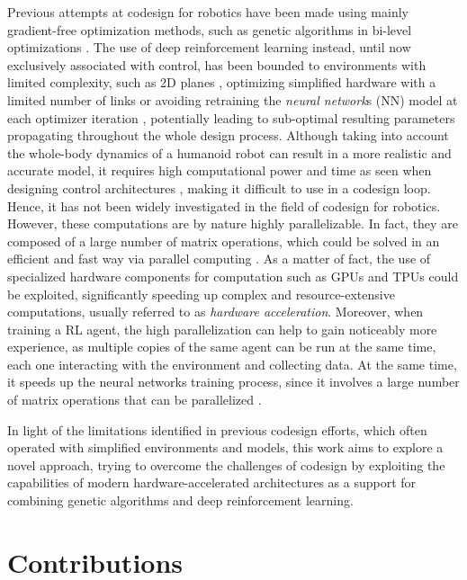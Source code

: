 Previous attempts at codesign for robotics have been made using mainly gradient-free optimization methods, such as genetic algorithms in bi-level optimizations \citep{sartore_optimization_2022,fadini_simulation_2022}. The use of deep reinforcement learning instead, until now exclusively associated with control, has been bounded to environments with limited complexity, such as 2D planes \citep{ha_reinforcement_2019}, optimizing simplified hardware with a limited number of links \citep{chen_hardware_2020} or avoiding retraining the \textit{neural network}s (NN) model at each optimizer iteration \citep{bjelonic_learning-based_2023}, potentially leading to sub-optimal resulting parameters propagating throughout the whole design process. Although taking into account the whole-body dynamics of a humanoid robot can result in a more realistic and accurate model, it requires high computational power and time as seen when designing control architectures \citep{ramuzat_benchmarking_2022}, making it difficult to use in a codesign loop. Hence, it has not been widely investigated in the field of codesign for robotics. However, these computations are by nature highly parallelizable. In fact, they are composed of a large number of matrix operations, which could be solved in an efficient and fast way via parallel computing \citep{gyawali_comparative_2023, tuma_2023}. As a matter of fact, the use of specialized hardware components for computation such as \ac{GPU}s and \ac{TPU}s could be exploited, significantly speeding up complex and resource-extensive computations, usually referred to as \textit{hardware acceleration}. Moreover, when training a \ac{RL} agent, the high parallelization can help to gain noticeably more experience, as multiple copies of the same agent can be run at the same time, each one interacting with the environment and collecting data. At the same time, it speeds up the neural networks training process, since it involves a large number of matrix operations that can be parallelized \citep{pandey_transformational_2022,gyawali_comparative_2023}.

In light of the limitations identified in previous codesign efforts, which often operated with simplified environments and models, this work aims to explore a novel approach, trying to overcome the challenges of codesign by exploiting the capabilities of modern hardware-accelerated architectures as a support for combining genetic algorithms and deep reinforcement learning.

\section*{Contributions}

